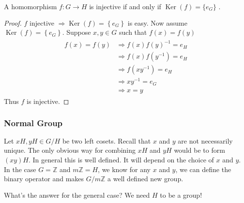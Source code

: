\documentclass{article}
\newcommand{\Ker}{\operatorname{Ker}}
\begin{document}
\begin{lema}\label{lem:hom_bi_e}
A homomorphism $f: G \rightarrow H$ is injective if and only if $\Ker(f)=\{e_G\}$ .
\end{lema} 
\begin{proof}
$f$ injective $\Rightarrow \operatorname{Ker}(f)=\left\{e_{G}\right\}$ is easy. Now assume $\operatorname{Ker}(f)=\left\{e_{G}\right\}$. Suppose $x, y \in G$ such that $f(x)=f(y)$
\begin{align*}
\begin{aligned}
f(x)=f(y) & \Rightarrow f(x) f(y)^{-1}=e_{H} \\
& \Rightarrow f(x) f\left(y^{-1}\right)=e_{H} \\
& \Rightarrow f\left(x y^{-1}\right)=e_{H} \\
& \Rightarrow x y^{-1}=e_{G} \\
& \Rightarrow x=y
\end{aligned}
\end{align*}
Thus $f$ is injective.
\end{proof} 
\subsubsection{Normal Group}\label{sssec:normal}
Let $x H, y H \in G / H$ be two left cosets. Recall that $x$ and $y$ are not necessarily unique. The only obvious way for combining $x H$ and $y H$ would be to form $(x y) H .$ In general this is  well defined. It will depend on the choice of $x$ and $y$. In the case $G=\mathbb{Z}$ and $m \mathbb{Z}=H$, we know for any $x$ and $y$, we can define the binary operator and makes $G/m \mathbb{Z}$ a well defined new group. 

What's the answer for the general case?  We need $H$ to be a  group!
\end{document}
